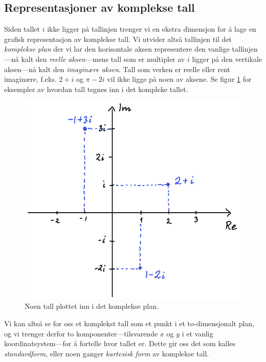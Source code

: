 \documentclass[a4paper,norsk,12pt]{article}
\begin{document}
\subsection{Representasjoner av komplekse tall}
Siden tallet $i$ ikke ligger på tallinjen trenger vi en ekstra dimensjon for å lage en grafisk representasjon av komplekse tall. Vi utvider altså tallinjen til det \emph{komplekse plan} der vi lar den horisontale aksen representere den vanlige tallinjen---nå kalt den \emph{reelle aksen}---mens tall som er multipler av $i$ ligger på den vertikale aksen---nå kalt den \emph{imaginære aksen}. Tall som verken er reelle eller rent imaginære, f.eks. $2+i$ og $\pi - 2i$ vil ikke ligge på noen av aksene. Se figur \ref{kompleks:fig:plan} for eksempler av hvordan tall tegnes inn i det kompleke tallet.
\begin{figure}[htp]
	\begin{center}
	\includegraphics[width=.5\textwidth]{./standardform}
	\end{center}
	\caption{Noen tall plottet inn i det komplekse plan.}
	\label{kompleks:fig:plan}
\end{figure}

\noindent
Vi kan altså se for oss et komplekst tall som et punkt i et to-dimensjonalt plan, og vi trenger derfor to komponenter---tilsvarende $x$ og $y$ i et vanlig koordinatsystem---for å fortelle hvor tallet er. Dette gir oss det som kalles \emph{standardform}, eller noen ganger \emph{kartesisk form} av komplekse tall.
\end{document}
